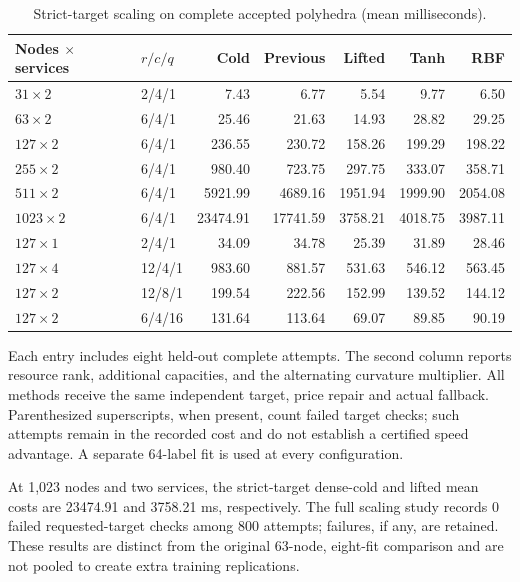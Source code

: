 \documentclass[11pt,letterpaper]{article}
\theoremstyle{definition}
\newcommand{\1}{\mathbf 1}
\begin{document}
\begin{table}[tbp]\centering\small
\caption{Strict-target scaling on complete accepted polyhedra (mean milliseconds).}\label{tab:r22-scaling}
\begin{tabular}{llrrrrr}
\toprule
Nodes $\times$ services & $r/c/q$ & Cold & Previous & Lifted & Tanh & RBF\\
\midrule
$31\times 2$ & 2/4/1 & 7.43 & 6.77 & 5.54 & 9.77 & 6.50\\
$63\times 2$ & 6/4/1 & 25.46 & 21.63 & 14.93 & 28.82 & 29.25\\
$127\times 2$ & 6/4/1 & 236.55 & 230.72 & 158.26 & 199.29 & 198.22\\
$255\times 2$ & 6/4/1 & 980.40 & 723.75 & 297.75 & 333.07 & 358.71\\
$511\times 2$ & 6/4/1 & 5921.99 & 4689.16 & 1951.94 & 1999.90 & 2054.08\\
$1023\times 2$ & 6/4/1 & 23474.91 & 17741.59 & 3758.21 & 4018.75 & 3987.11\\
$127\times 1$ & 2/4/1 & 34.09 & 34.78 & 25.39 & 31.89 & 28.46\\
$127\times 4$ & 12/4/1 & 983.60 & 881.57 & 531.63 & 546.12 & 563.45\\
$127\times 2$ & 12/8/1 & 199.54 & 222.56 & 152.99 & 139.52 & 144.12\\
$127\times 2$ & 6/4/16 & 131.64 & 113.64 & 69.07 & 89.85 & 90.19\\
\bottomrule
\end{tabular}
\par\smallskip\begin{minipage}{.98\textwidth}\small Each entry includes eight held-out complete attempts. The second column reports resource rank, additional capacities, and the alternating curvature multiplier. All methods receive the same independent target, price repair and actual fallback. Parenthesized superscripts, when present, count failed target checks; such attempts remain in the recorded cost and do not establish a certified speed advantage. A separate 64-label fit is used at every configuration.\end{minipage}
\end{table}



At 1,023 nodes and two services, the strict-target dense-cold and lifted mean costs are 23474.91 and 3758.21 ms, respectively. The full scaling study records 0 failed requested-target checks among 800 attempts; failures, if any, are retained. These results are distinct from the original 63-node, eight-fit comparison and are not pooled to create extra training replications.
\end{document}

